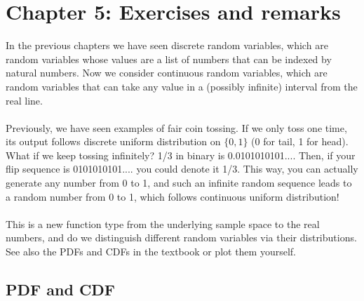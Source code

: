 

\chapter{Chapter 5: Exercises and remarks}
In the previous chapters we have seen discrete random variables, which are random variables whose values are a list of numbers that can be indexed by natural numbers. Now we consider
continuous random variables, which are random variables that can take any value in a (possibly infinite) interval
from the real line.\\~\\
Previously, we have seen examples of fair coin tossing. If we only toss one time, its output follows discrete uniform distribution on $\{0,1\}$ (0 for tail, 1 for head). What if we keep tossing infinitely? 1/3 in binary is 0.0101010101.... Then, if your flip sequence is 0101010101.... you could denote it 1/3. This way, you can actually generate any number from 0 to 1, and such an infinite random sequence leads to a random number from 0 to 1, which follows continuous uniform distribution! 
\\~\\
This is a new function type from the underlying sample space to the real numbers, and do we distinguish different random variables via their
distributions. See also the PDFs and CDFs  in the textbook or plot them yourself. 

\section{PDF and CDF}
\label{sec:section-5.1}

